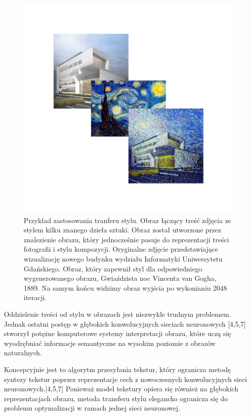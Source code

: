 \documentclass[brudnopis]{xmgr}
\begin{document}
 \begin{figure}[!tbh]
\centering
\includegraphics[width=.8\hsize]{fig/6}
\caption{Przykład zastosowania tranferu stylu.
Obraz łączący treść zdjęcia ze stylem kilku znanego dzieła sztuki. Obraz został utworzone przez znalezienie obrazu, który jednocześnie pasuje do reprezentacji treści fotografii i stylu kompozycji. Oryginalne zdjęcie przedstawiające wizualizację nowego budynku wydziału Informatyki Uniwersytetu Gdańskiego. Obraz, który zapewnił styl dla odpowiedniego wygenerowanego obrazu, Gwiaździsta noc Vincenta van Gogha, 1889. Na samym końcu widzimy obraz wyjścia po wykonianiu 2048 iteracji.
\label{RYS.6}}
\end{figure}

Oddzielenie treści od stylu w obrazach jest niezwykle trudnym problemem. Jednak ostatni postęp w głębokich konwolucyjnych sieciach neuronowych [4,5,7] stworzył potężne komputerowe systemy interpretacji obrazu, które uczą się wyodrębniać informacje semantyczne na wysokim poziomie z obrazów naturalnych.

Koncepcyjnie jest to algorytm przesyłania tekstur, który ogranicza metodę syntezy tekstur poprzez reprezentacje cech z nowoczesnych konwolucyjnych sieci neuronowych.[4,5,7] Ponieważ model tekstury opiera się również na głębokich reprezentacjach obrazu, metoda transferu stylu elegancko ogranicza się do problemu optymalizacji w ramach jednej sieci neuronowej.
\end{document}
